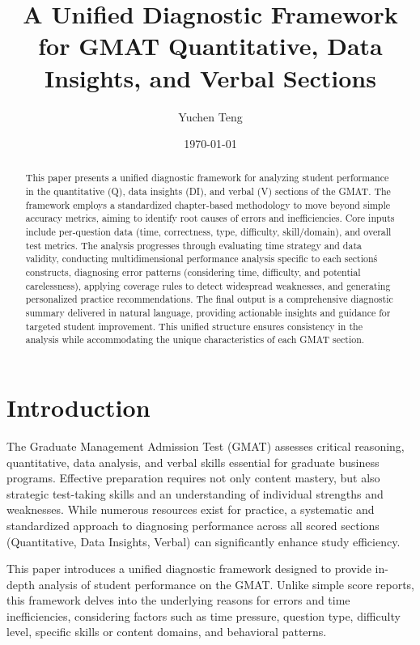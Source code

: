 \documentclass{article}
\title{A Unified Diagnostic Framework for GMAT Quantitative, Data Insights, and Verbal Sections}
\author{Yuchen Teng} %
\date{\today}
\begin{document}
\sloppy
{}

\maketitle

\begin{abstract}
This paper presents a unified diagnostic framework for analyzing student performance in the quantitative (Q), data insights (DI), and verbal (V) sections of the GMAT. The framework employs a standardized chapter-based methodology to move beyond simple accuracy metrics, aiming to identify root causes of errors and inefficiencies. Core inputs include per-question data (time, correctness, type, difficulty, skill/domain), and overall test metrics. The analysis progresses through evaluating time strategy and data validity, conducting multidimensional performance analysis specific to each section\'s constructs, diagnosing error patterns (considering time, difficulty, and potential carelessness), applying coverage rules to detect widespread weaknesses, and generating personalized practice recommendations. The final output is a comprehensive diagnostic summary delivered in natural language, providing actionable insights and guidance for targeted student improvement. This unified structure ensures consistency in the analysis while accommodating the unique characteristics of each GMAT section.
\end{abstract}

\section{Introduction}

The Graduate Management Admission Test (GMAT) assesses critical reasoning, quantitative, data analysis, and verbal skills essential for graduate business programs. Effective preparation requires not only content mastery, but also strategic test-taking skills and an understanding of individual strengths and weaknesses. While numerous resources exist for practice, a systematic and standardized approach to diagnosing performance across all scored sections (Quantitative, Data Insights, Verbal) can significantly enhance study efficiency.

This paper introduces a unified diagnostic framework designed to provide in-depth analysis of student performance on the GMAT. Unlike simple score reports, this framework delves into the underlying reasons for errors and time inefficiencies, considering factors such as time pressure, question type, difficulty level, specific skills or content domains, and behavioral patterns.
\end{document}
